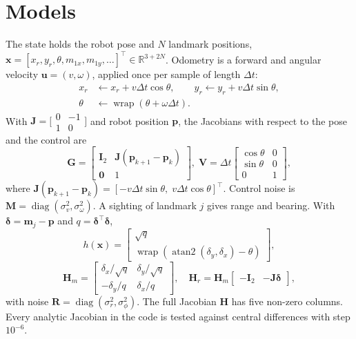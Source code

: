 \documentclass[conference]{IEEEtran}
\newcommand{\vect}[1]{\mathbf{#1}}
\newcommand{\T}{^{\top}}
\newcommand{\wrap}{\operatorname{wrap}}
\begin{document}
\section{Models}
The state holds the robot pose and $N$ landmark positions, $\vect{x} = [x_r, y_r, \theta, m_{1x}, m_{1y}, \dots]\T \in \mathbb{R}^{3+2N}$. Odometry is a forward and angular velocity $\vect{u} = (v, \omega)$, applied once per sample of length $\Delta t$:
\begin{equation}
\begin{aligned}
x_r &\leftarrow x_r + v\Delta t\cos\theta, \qquad y_r \leftarrow y_r + v\Delta t\sin\theta,\\
\theta &\leftarrow \wrap(\theta + \omega\Delta t).
\end{aligned}
\end{equation}
With $\vect{J} = \bigl[\begin{smallmatrix}0 & -1\\ 1 & 0\end{smallmatrix}\bigr]$ and robot position $\vect{p}$, the Jacobians with respect to the pose and the control are
\begin{equation}
\vect{G} = \begin{bmatrix} \vect{I}_2 & \vect{J}(\vect{p}_{k+1} {-} \vect{p}_k)\\ \vect{0} & 1 \end{bmatrix}\!,\;
\vect{V} = \Delta t\!\begin{bmatrix} \cos\theta & 0\\ \sin\theta & 0\\ 0 & 1 \end{bmatrix}\!,
\label{eq:G}
\end{equation}
where $\vect{J}(\vect{p}_{k+1}-\vect{p}_k) = [-v\Delta t\sin\theta,\; v\Delta t\cos\theta]\T$. Control noise is $\vect{M} = \operatorname{diag}(\sigma_v^2, \sigma_\omega^2)$. A sighting of landmark $j$ gives range and bearing. With $\boldsymbol{\delta} = \vect{m}_j - \vect{p}$ and $q = \boldsymbol{\delta}\T\boldsymbol{\delta}$,
\begin{equation}
h(\vect{x}) = \begin{bmatrix} \sqrt{q}\\ \wrap(\operatorname{atan2}(\delta_y, \delta_x) - \theta)\end{bmatrix},
\end{equation}
\begin{equation}
\vect{H}_m = \begin{bmatrix} \delta_x/\sqrt{q} & \delta_y/\sqrt{q}\\ -\delta_y/q & \delta_x/q \end{bmatrix},\quad
\vect{H}_r = \vect{H}_m\begin{bmatrix} -\vect{I}_2 & -\vect{J}\boldsymbol{\delta}\end{bmatrix},
\label{eq:Hr}
\end{equation}
with noise $\vect{R} = \operatorname{diag}(\sigma_r^2, \sigma_\phi^2)$. The full Jacobian $\vect{H}$ has five non-zero columns. Every analytic Jacobian in the code is tested against central differences with step $10^{-6}$.
\end{document}
